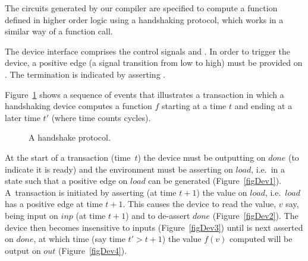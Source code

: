 
The circuits generated by our compiler are specified to compute a
function defined in higher order logic using a handshaking protocol,
which  works in a similar way of a function call.  

The device interface comprises the control signals  and
.  In order to trigger the device, a positive edge (a signal
transition from low to high) must be provided on . The
termination is indicated by asserting .

Figure~\ref{figDev} shows a sequence of events that illustrates a
transaction in which a handshaking device computes a function $f$
starting at a time $t$ and ending at a later time $t'$ (where time
counts cycles).

\vspace*{-6mm}

\begin{figure}[htb]
   \centerline{
      }
   \hspace*{0.4cm}
   \centerline{
      \hspace*{0cm}}
      \caption{\label{figDev}A handshake protocol.}
\end{figure}

\vspace*{-6mm}


At the start of a transaction (time~$t$) the device must be outputting
 on $done$ (to indicate it is ready) and the environment must
be asserting  on $load$, i.e.~in a state such that a positive
edge on $load$ can be generated (Figure~\ref{figDev1}).  A~transaction
is initiated by asserting (at time $t{+}1$) the value  on
$load$, i.e.~$load$ has a positive edge at time $t{+}1$. This causes
the device to read the value, $v$ say, being input on $inp$ (at time
$t{+}1$) and to de-assert $done$ (Figure~\ref{figDev2}).  The device
then becomes insensitive to inputs (Figure~\ref{figDev3}) until
 is next asserted on $done$, at which time (say time $t' >
t{+}1$) the value $f(v)$ computed will be output on $out$
(Figure~\ref{figDev4}).

